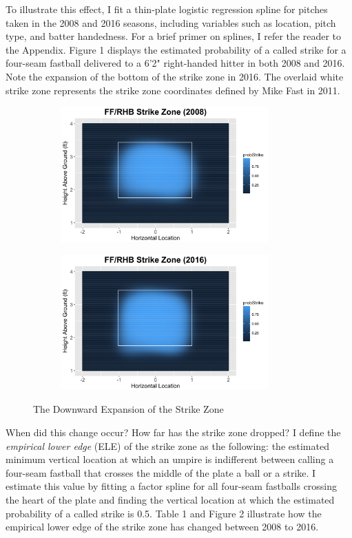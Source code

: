 \documentclass[11pt]{article}
\begin{document}
To illustrate this effect, I fit a thin-plate logistic regression spline for pitches taken in the 2008 and 2016 seasons, including variables such as location, pitch type, and batter handedness.  For a brief primer on splines, I refer the reader to the Appendix.  Figure 1 displays the estimated probability of a called strike for a four-seam fastball delivered to a 6'2" right-handed hitter in both 2008 and 2016.  Note the expansion of the bottom of the strike zone in 2016.  The overlaid white strike zone represents the strike zone coordinates defined by Mike Fast in 2011.

\begin{figure}[ht]
\centering
\begin{subfigure}[b]{0.48\textwidth}
\centering
\includegraphics[height = 5.2cm]{../Output/fig1a.png}
\end{subfigure}
\begin{subfigure}[b]{0.48\textwidth}
\centering
\includegraphics[height = 5.2cm]{../Output/fig1b.png}
\end{subfigure}
\caption{The Downward Expansion of the Strike Zone}
\end{figure}

When did this change occur?  How far has the strike zone dropped?  I define the \textit{empirical lower edge} (ELE) of the strike zone as the following: the estimated minimum vertical location at which an umpire is indifferent between calling a four-seam fastball that crosses the middle of the plate a ball or a strike.  I estimate this value by fitting a factor spline for all four-seam fastballs crossing the heart of the plate and finding the vertical location at which the estimated probability of a called strike is 0.5.  Table 1 and Figure 2 illustrate how the empirical lower edge of the strike zone has changed between 2008 to 2016.
\end{document}

